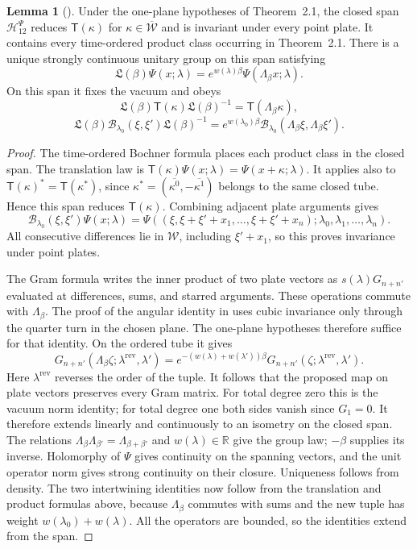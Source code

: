 \documentclass[11pt,letterpaper,reqno]{amsart}
\theoremstyle{definition}
\newtheorem{qcmlemma}[qcmproposition]{Lemma}
\newenvironment{lemma}[1][]{\pushQED{\qed}\renewcommand{\qedsymbol}{$\blacksquare$}\begin{qcmlemma}[#1]}{\popQED\end{qcmlemma}}
\begin{document}
\begin{lemma}\label{qcm:plate-boosts}
Under the one-plane hypotheses of Theorem~2.1, the closed span
$\mathcal H^{\Psi}_{12}$ reduces $\mathsf T(\kappa)$ for
$\kappa\in\overline{\mathcal W}$ and is invariant under every point
plate. It contains every time-ordered product class occurring in
Theorem~2.1. There is a unique strongly continuous unitary group on
this span satisfying
\[
 \mathfrak L(\beta)\Psi(x;\lambda)
   =e^{w(\lambda)\beta}\Psi(\Lambda_\beta x;\lambda).
\]
On this span it fixes the vacuum and obeys
\[
 \mathfrak L(\beta)\mathsf T(\kappa)\mathfrak L(\beta)^{-1}
      =\mathsf T(\Lambda_\beta\kappa),
\]
\[
 \mathfrak L(\beta)\mathcal B_{\lambda_0}(\xi,\xi')
                     \mathfrak L(\beta)^{-1}
 =e^{w(\lambda_0)\beta}
             \mathcal B_{\lambda_0}(\Lambda_\beta\xi,\Lambda_\beta\xi').
\]
\end{lemma}

\begin{proof}
The time-ordered Bochner formula places each product class in the
closed span. The translation law is
$\mathsf T(\kappa)\Psi(x;\lambda)=\Psi(x+\kappa;\lambda)$.
It applies also to $\mathsf T(\kappa)^*=\mathsf T(\kappa^*)$, since
$\kappa^*=(\overline{\kappa^0},-\overline{\kappa^1})$ belongs to the
same closed tube. Hence this span reduces $\mathsf T(\kappa)$.
Combining adjacent plate arguments gives
\[
 \mathcal B_{\lambda_0}(\xi,\xi')\Psi(x;\lambda)
 =\Psi((\xi,\xi+\xi'+x_1,\ldots,\xi+\xi'+x_n);
                    \lambda_0,\lambda_1,\ldots,\lambda_n).
\]
All consecutive differences lie in $\mathcal W$, including
$\xi'+x_1$, so this proves invariance under point plates.

The Gram formula writes the inner product of two plate vectors as
$s(\lambda)G_{n+n'}$ evaluated at differences, sums, and starred
arguments. These operations commute with $\Lambda_\beta$.
The proof of the angular identity in
\cite[Section~8.5, equation~(8.41)]{QEDConstruction} uses cubic
invariance only through the quarter turn in the chosen plane.
The one-plane hypotheses therefore suffice for that identity.
On the ordered tube it gives
\[
 G_{n+n'}(\Lambda_\beta\zeta;\lambda^{\mathrm{rev}},\lambda')
 =e^{-(w(\lambda)+w(\lambda'))\beta}
                G_{n+n'}(\zeta;\lambda^{\mathrm{rev}},\lambda').
\]
Here $\lambda^{\mathrm{rev}}$ reverses the order of the tuple.
It follows that the proposed map on plate vectors preserves every
Gram matrix. For total degree zero this is the vacuum norm identity;
for total degree one both sides vanish since $G_1=0$.
It therefore extends linearly and continuously to an isometry on the
closed span. The relations
$\Lambda_\beta\Lambda_{\beta'}=\Lambda_{\beta+\beta'}$ and
$w(\lambda)\in\mathbb R$ give the group law; $-\beta$ supplies its
inverse. Holomorphy of $\Psi$ gives continuity on the spanning vectors,
and the unit operator norm gives strong continuity on their closure.
Uniqueness follows from density.
The two intertwining identities now follow from the translation and
product formulas above, because $\Lambda_\beta$ commutes with sums
and the new tuple has weight $w(\lambda_0)+w(\lambda)$.
All the operators are bounded, so the identities extend from the span.
\end{proof}
\end{document}
